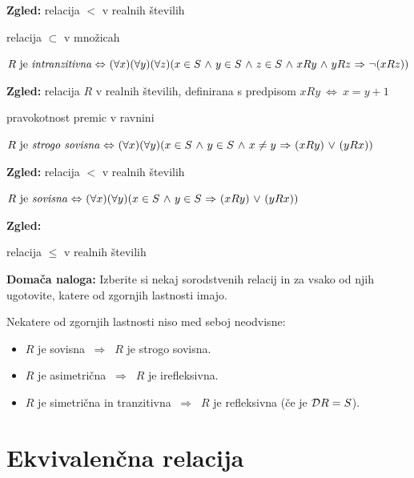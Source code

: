 \documentclass[11pt,paper=b5,DIV=13,headinclude,footinclude]{scrbook}
\def\ali {{~\vee~}}
\def\inn {{~\wedge~}}
\def\sledi {{~\Rightarrow~}}
\def\cee {{~\Leftrightarrow~}}
\begin{document}
\textbf{ Zgled:} relacija $<$ v realnih številih

relacija $\subset$ v množicah

\bigskip

$R \textrm{ je {\em intranzitivna}} \cee (\forall x)(\forall y)(\forall z)(x\in S\inn y\in S\inn z\in S\inn xRy\inn yRz\sledi \neg(xRz))$


\textbf{ Zgled:}
relacija $R$ v realnih številih, definirana s predpisom $xRy \cee x = y + 1$

pravokotnost premic v ravnini

\bigskip

$R \textrm{ je {\em strogo sovisna}} \cee (\forall x)(\forall y)(x\in S\inn y\in S
\inn x\neq y\sledi (xRy)\ali (yRx))$


\textbf{ Zgled:}
relacija $<$ v realnih  številih

\bigskip

$R \textrm{ je {\em sovisna}} \cee (\forall x)(\forall y)(x\in S\inn y\in S
\sledi (xRy)\ali (yRx))$


\textbf{ Zgled:}

relacija $\le$ v realnih številih

\bigskip
\textbf{ Domača naloga:}
Izberite si nekaj sorodstvenih relacij in za vsako od njih ugotovite, katere od zgornjih lastnosti imajo.

\bigskip
Nekatere od zgornjih lastnosti niso med seboj neodvisne:
\begin{itemize}
  \item $R$ je sovisna $\sledi$ $R$ je strogo sovisna.
  \item $R$ je asimetrična $\sledi$ $R$ je irefleksivna.
  \item $R$ je simetrična in tranzitivna $\sledi$ $R$ je refleksivna (če je ${\cal D}R = S$).
\end{itemize}

\section{Ekvivalenčna relacija}
\end{document}
